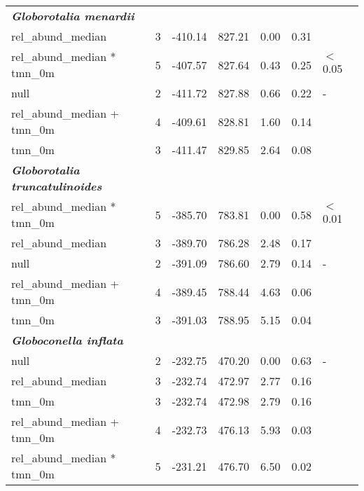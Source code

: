 \documentclass[a4paper]{article}
\begin{document}
\begin{table}
\begin{tabular}{lrrrrrl}
  \textbf{\textit{Globorotalia menardii}} &  &  &  &  &  &  \\ 
  rel\_abund\_median &   3 & -410.14 & 827.21 & 0.00 & 0.31 &  \\ 
  rel\_abund\_median * tmn\_0m &   5 & -407.57 & 827.64 & 0.43 & 0.25 & $<$ 0.05 \\ 
  null &   2 & -411.72 & 827.88 & 0.66 & 0.22 & - \\ 
  rel\_abund\_median + tmn\_0m &   4 & -409.61 & 828.81 & 1.60 & 0.14 &  \\ 
  tmn\_0m &   3 & -411.47 & 829.85 & 2.64 & 0.08 &  \\ 
  
  \textbf{\textit{Globorotalia truncatulinoides}} &  &  &  &  &  &  \\ 
  rel\_abund\_median * tmn\_0m &   5 & -385.70 & 783.81 & 0.00 & 0.58 & $<$ 0.01 \\ 
  rel\_abund\_median &   3 & -389.70 & 786.28 & 2.48 & 0.17 &  \\ 
  null &   2 & -391.09 & 786.60 & 2.79 & 0.14 & - \\ 
  rel\_abund\_median + tmn\_0m &   4 & -389.45 & 788.44 & 4.63 & 0.06 &  \\ 
  tmn\_0m &   3 & -391.03 & 788.95 & 5.15 & 0.04 &  \\ 
  
  \textbf{\textit{Globoconella inflata}} &  &  &  &  &  &  \\ 
  null &   2 & -232.75 & 470.20 & 0.00 & 0.63 & - \\ 
  rel\_abund\_median &   3 & -232.74 & 472.97 & 2.77 & 0.16 &  \\ 
  tmn\_0m &   3 & -232.74 & 472.98 & 2.79 & 0.16 &  \\ 
  rel\_abund\_median + tmn\_0m &   4 & -232.73 & 476.13 & 5.93 & 0.03 &  \\ 
  rel\_abund\_median * tmn\_0m &   5 & -231.21 & 476.70 & 6.50 & 0.02 &  \\ 
  
   \hline
\end{tabular}
\end{table}


\label{Bibliography}
\end{document}
